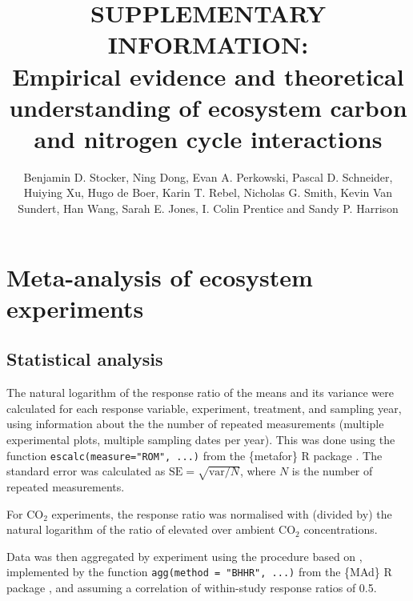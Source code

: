 \documentclass{myreport}
\begin{document}
\pagestyle{headings}

\renewcommand{\thefigure}{\arabic{figure}}
\renewcommand{\thetable}{\arabic{table}}
\renewcommand{\thesection}{Notes S\arabic{section}}
\renewcommand{\theequation}{\arabic{equation}}

\setcounter{section}{1}

% 

\title{SUPPLEMENTARY INFORMATION:\\
Empirical evidence and theoretical understanding of ecosystem carbon and nitrogen cycle interactions}
\author{Benjamin D. Stocker, Ning Dong, Evan A. Perkowski, Pascal D. Schneider,
Huiying Xu, Hugo de Boer, Karin T. Rebel, Nicholas G. Smith, Kevin Van Sundert, Han Wang, Sarah E. Jones, I. Colin Prentice and Sandy P. Harrison} 


\section{Meta-analysis of ecosystem experiments}

\subsection{Statistical analysis}
\label{sec:statisticalanalysis}

The natural logarithm of the response ratio of the means and its variance were calculated for each response variable, experiment, treatment, and sampling year, using information about the the number of repeated measurements (multiple experimental plots, multiple sampling dates per year). This was done using the function \texttt{escalc(measure="ROM", ...)} from the \{metafor\} R package \citep{viechtbauer_conducting_2010}. The standard error was calculated as $\text{SE} = \sqrt{\text{var}/N}$, where $N$ is the number of repeated measurements.

For CO$_2$ experiments, the response ratio was normalised with (divided by) the natural logarithm of the ratio of elevated over ambient CO$_2$ concentrations.

Data was then aggregated by experiment using the procedure based on \citet{borenstein_effect_2009}, implemented by the function \texttt{agg(method = "BHHR", ...)} from the \{MAd\} R package \citep{mad_r_package}, and assuming a correlation of within-study response ratios of 0.5.
\end{document}
